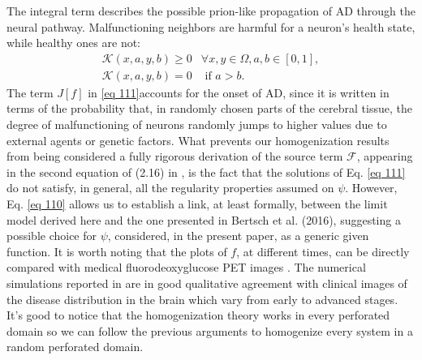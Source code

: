 The integral term describes the possible prion-like propagation of AD through the neural pathway. Malfunctioning neighbors are harmful for a neuron's health state, while healthy ones are not:
$$
\begin{array}{rr}
\mathcal{K}(x, a, y, b) \geq 0 & \forall x, y \in \Omega, a, b \in[0,1], \\
\mathcal{K}(x, a, y, b)=0 & \text { if } a>b .
\end{array}
$$
The term $J[f]$ in \eqref{eq 111}accounts for the onset of AD, since it is written in terms of the probability that, in randomly chosen parts of the cerebral tissue, the degree of malfunctioning of neurons randomly jumps to higher values due to external agents or genetic factors. What prevents our homogenization results from being considered a fully rigorous derivation of the source term $\mathcal{F}$, appearing in the second equation of (2.16) in \cite{Bertsch}, is the fact that the solutions of Eq. \eqref{eq 111} do not satisfy, in general, all the regularity properties assumed on $\psi$. However, Eq. \eqref{eq 110} allows us to establish a link, at least formally, between the limit model derived here and the one presented in Bertsch et al. (2016), suggesting a possible choice for $\psi$, considered, in the present paper, as a generic given function.
It is worth noting that the plots of $f$, at different times, can be directly compared with medical fluorodeoxyglucose PET images \cite{Bertsch}. The numerical simulations reported in \cite{Bertsch} are in good qualitative agreement with clinical images of the disease distribution in the brain which vary from early to advanced stages.
It's good to notice that the homogenization theory works in every perforated domain so we can follow the previous arguments to homogenize every system in a random perforated domain.

